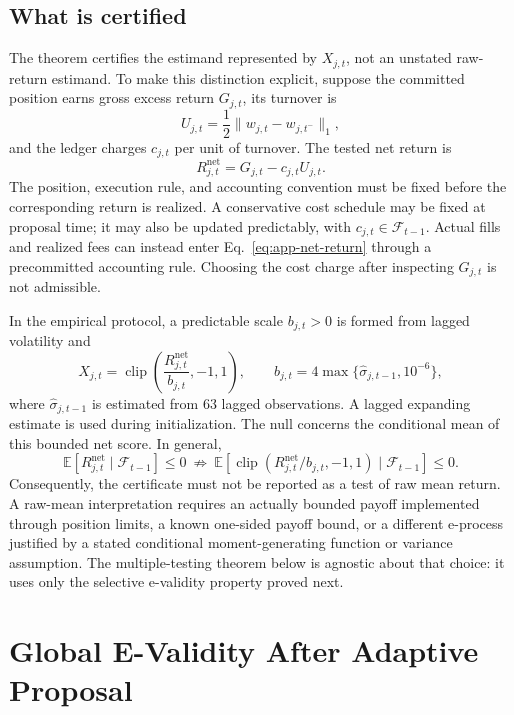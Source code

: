 \subsection{What is certified}
\label{app:estimand}

The theorem certifies the estimand represented by \(X_{j,t}\), not an
unstated raw-return estimand.  To make this distinction explicit, suppose
the committed position earns gross excess return \(G_{j,t}\), its turnover is
\[
  U_{j,t}=\frac12\lVert w_{j,t}-w_{j,t^-}\rVert_1,
\]
and the ledger charges \(c_{j,t}\) per unit of turnover.  The tested net
return is
\begin{equation}
  R^{\mathrm{net}}_{j,t}=G_{j,t}-c_{j,t}U_{j,t}.
  \label{eq:app-net-return}
\end{equation}
The position, execution rule, and accounting convention must be fixed before
the corresponding return is realized.  A conservative cost schedule may be
fixed at proposal time; it may also be updated predictably, with
\(c_{j,t}\in\mathcal F_{t-1}\).  Actual fills and realized fees can instead
enter Eq.~\eqref{eq:app-net-return} through a precommitted accounting rule.
Choosing the cost charge after inspecting \(G_{j,t}\) is not admissible.

In the empirical protocol, a predictable scale \(b_{j,t}>0\) is formed from
lagged volatility and
\begin{equation}
  X_{j,t}
  =\operatorname{clip}\!\left(
      \frac{R^{\mathrm{net}}_{j,t}}{b_{j,t}},-1,1\right),
  \qquad
  b_{j,t}=4\max\{\widehat\sigma_{j,t-1},10^{-6}\},
  \label{eq:app-score}
\end{equation}
where \(\widehat\sigma_{j,t-1}\) is estimated from 63 lagged observations.
A lagged expanding estimate is used during initialization.  The null concerns
the conditional mean of this bounded net score.  In general,
\[
  \mathbb E[R^{\mathrm{net}}_{j,t}\mid\mathcal F_{t-1}]\leq 0
  \ \not\Longrightarrow\
  \mathbb E[\operatorname{clip}(R^{\mathrm{net}}_{j,t}/b_{j,t},-1,1)
       \mid\mathcal F_{t-1}]\leq 0.
\]
Consequently, the certificate must not be reported as a test of raw mean
return.  A raw-mean interpretation requires an actually bounded payoff
implemented through position limits, a known one-sided payoff bound, or a
different e-process justified by a stated conditional moment-generating
function or variance assumption.  The multiple-testing theorem below is
agnostic about that choice: it uses only the selective e-validity property
proved next.

\section{Global E-Validity After Adaptive Proposal}
\label{app:evalidity}

